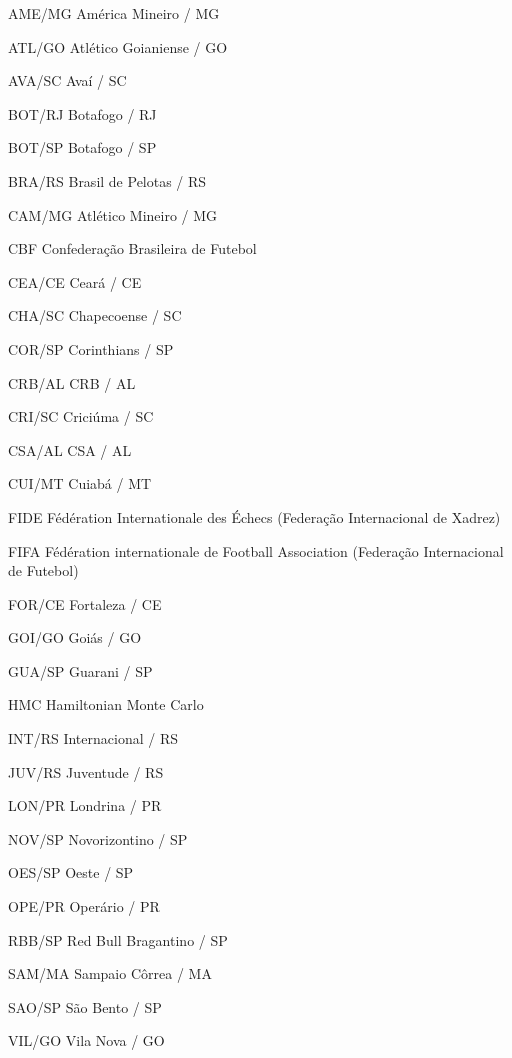 \begin{siglas}
    \item[AME/MG] América Mineiro / MG
    \item[ATL/GO] Atlético Goianiense / GO
    \item[AVA/SC] Avaí / SC
    \item[BOT/RJ] Botafogo / RJ
    \item[BOT/SP] Botafogo / SP
    \item[BRA/RS] Brasil de Pelotas / RS
    \item[CAM/MG] Atlético Mineiro / MG
    \item[CBF] Confederação Brasileira de Futebol
    \item[CEA/CE] Ceará / CE
    \item[CHA/SC] Chapecoense / SC
    \item[COR/SP] Corinthians / SP
    \item[CRB/AL] CRB / AL
    \item[CRI/SC] Criciúma / SC
    \item[CSA/AL] CSA / AL
    \item[CUI/MT] Cuiabá / MT
    \item[FIDE] Fédération Internationale des Échecs (Federação Internacional de Xadrez)
    \item[FIFA] Fédération internationale de Football Association (Federação Internacional de Futebol)
    \item[FOR/CE] Fortaleza / CE
    \item[GOI/GO] Goiás / GO
    \item[GUA/SP] Guarani / SP
    \item[HMC] Hamiltonian Monte Carlo
    \item[INT/RS] Internacional / RS
    \item[JUV/RS] Juventude / RS
    \item[LON/PR] Londrina / PR
    \item[NOV/SP] Novorizontino / SP
    \item[OES/SP] Oeste / SP
    \item[OPE/PR] Operário / PR
    \item[RBB/SP] Red Bull Bragantino / SP
    \item[SAM/MA] Sampaio Côrrea / MA
    \item[SAO/SP] São Bento / SP
    \item[VIL/GO] Vila Nova / GO
\end{siglas}


